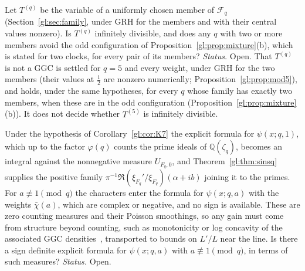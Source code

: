 \begin{problem}\label{gl:op:family}
Let $T^{(q)}$ be the variable of a uniformly chosen member of $\mathcal F_q$ (Section~\ref{gl:sec:family}, under GRH for the members and with their central values nonzero). Is $T^{(q)}$ infinitely divisible, and does any $q$ with two or more members avoid the odd configuration of Proposition~\ref{gl:prop:mixture}(b), which is stated for two clocks, for every pair of its members? \emph{Status.} Open. That $T^{(q)}$ is not a GGC is settled for $q=5$ and every weight, under GRH for the two members (their values at $\tfrac12$ are nonzero numerically; Proposition~\ref{gl:prop:mod5}), and holds, under the same hypotheses, for every $q$ whose family has exactly two members, when these are in the odd configuration (Proposition~\ref{gl:prop:mixture}(b)). It does not decide whether $T^{(5)}$ is infinitely divisible.
\end{problem}

\begin{problem}\label{gl:op:signdefinite}
Under the hypothesis of Corollary~\ref{gl:cor:K7} the explicit formula for $\psi(x;q,1)$, which up to the factor $\varphi(q)$ counts the prime ideals of $\mathbb Q(\zeta_q)$, becomes an integral against the nonnegative measure $U_{F_q,0}$, and Theorem~\ref{gl:thm:sinsq} supplies the positive family $\pi^{-1}\Re(\xi_{F_q}'/\xi_{F_q})(\alpha+ib)$ joining it to the primes. For $a\not\equiv1\pmod q$ the characters enter the formula for $\psi(x;q,a)$ with the weights $\bar\chi(a)$, which are complex or negative, and no sign is available. These are zero counting measures and their Poisson smoothings, so any gain must come from structure beyond counting, such as monotonicity or log concavity of the associated GGC densities~\cite[Ch.~4]{Bondesson}, transported to bounds on $L'/L$ near the line. Is there a sign definite explicit formula for $\psi(x;q,a)$ with $a\not\equiv1\pmod q$, in terms of such measures? \emph{Status.} Open.
\end{problem}

